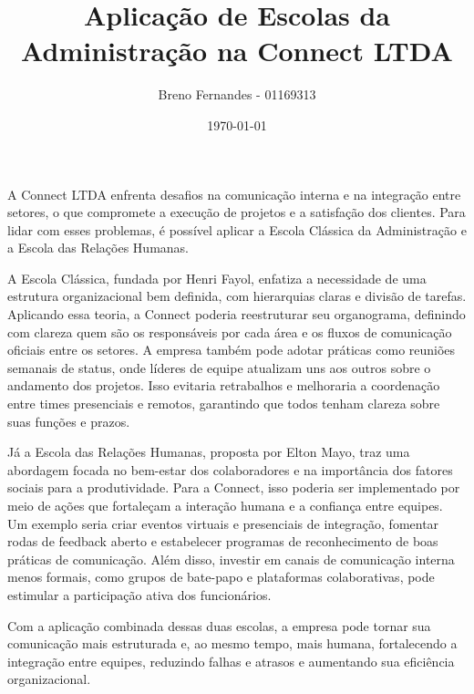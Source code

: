 \documentclass[12pt]{article}
\title{Aplicação de Escolas da Administração na Connect LTDA}
\author{Breno Fernandes - 01169313}
\date{\today}
\begin{document}
\maketitle

A Connect LTDA enfrenta desafios na comunicação interna e na integração entre setores, o que compromete a execução de projetos e a satisfação dos clientes. Para lidar com esses problemas, é possível aplicar a Escola Clássica da Administração e a Escola das Relações Humanas.

A Escola Clássica, fundada por Henri Fayol, enfatiza a necessidade de uma estrutura organizacional bem definida, com hierarquias claras e divisão de tarefas. Aplicando essa teoria, a Connect poderia reestruturar seu organograma, definindo com clareza quem são os responsáveis por cada área e os fluxos de comunicação oficiais entre os setores. A empresa também pode adotar práticas como reuniões semanais de status, onde líderes de equipe atualizam uns aos outros sobre o andamento dos projetos. Isso evitaria retrabalhos e melhoraria a coordenação entre times presenciais e remotos, garantindo que todos tenham clareza sobre suas funções e prazos.

Já a Escola das Relações Humanas, proposta por Elton Mayo, traz uma abordagem focada no bem-estar dos colaboradores e na importância dos fatores sociais para a produtividade. Para a Connect, isso poderia ser implementado por meio de ações que fortaleçam a interação humana e a confiança entre equipes. Um exemplo seria criar eventos virtuais e presenciais de integração, fomentar rodas de feedback aberto e estabelecer programas de reconhecimento de boas práticas de comunicação. Além disso, investir em canais de comunicação interna menos formais, como grupos de bate-papo e plataformas colaborativas, pode estimular a participação ativa dos funcionários.

Com a aplicação combinada dessas duas escolas, a empresa pode tornar sua comunicação mais estruturada e, ao mesmo tempo, mais humana, fortalecendo a integração entre equipes, reduzindo falhas e atrasos e aumentando sua eficiência organizacional.
\end{document}
